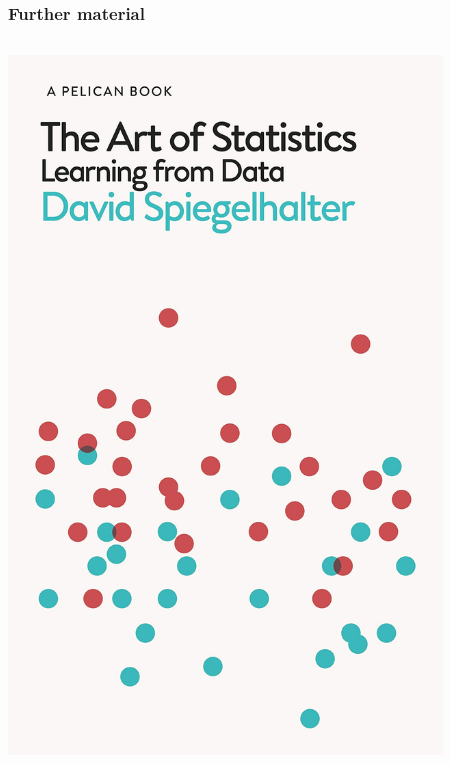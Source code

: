 \documentclass[handout]{beamer}
\begin{document}
\begin{frame}
	\frametitle{Further material}
	
	\begin{columns}
		\begin{column}{0.3\textwidth}
			\includegraphics[width=0.9\textwidth]{../figures/art_of_statistics.jpeg}
		\end{column}
		\begin{column}{0.3\textwidth}

\end{column}
\end{columns}
\end{frame}
\end{document}
